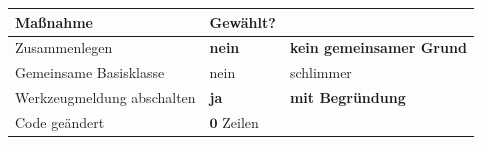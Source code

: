 \begin{technik}
\begin{center}
\renewcommand{\arraystretch}{1.5}
\begin{tabular}{@{}P{2.8cm}P{2.4cm}P{2.6cm}@{}}
\toprule
\textbf{Maßnahme} & \textbf{Gewählt?} & \\
\midrule
Zusammenlegen & \textcolor{akzent}{\textbf{nein}} & \textbf{kein gemeinsamer Grund}\\
Gemeinsame Basisklasse & \textcolor{akzent}{nein} & \textcolor{akzent}{schlimmer}\\
Werkzeug\-meldung abschalten & \textcolor{gruen}{\textbf{ja}} & \textcolor{gruen}{\textbf{mit Begründung}}\\
Code geändert & \textcolor{gruen}{$\mathbf{0}$ Zeilen} & \\
\bottomrule
\end{tabular}
\end{center}

\begin{center}
\begin{minipage}{0.86\textwidth}
\end{minipage}
\end{center}
\end{technik}

